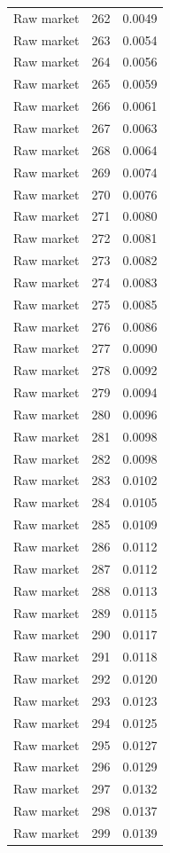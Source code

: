\begin{table}[htbp]
\begin{tabular}{lll}
Raw market & 262 & 0.0049 \\
Raw market & 263 & 0.0054 \\
Raw market & 264 & 0.0056 \\
Raw market & 265 & 0.0059 \\
Raw market & 266 & 0.0061 \\
Raw market & 267 & 0.0063 \\
Raw market & 268 & 0.0064 \\
Raw market & 269 & 0.0074 \\
Raw market & 270 & 0.0076 \\
Raw market & 271 & 0.0080 \\
Raw market & 272 & 0.0081 \\
Raw market & 273 & 0.0082 \\
Raw market & 274 & 0.0083 \\
Raw market & 275 & 0.0085 \\
Raw market & 276 & 0.0086 \\
Raw market & 277 & 0.0090 \\
Raw market & 278 & 0.0092 \\
Raw market & 279 & 0.0094 \\
Raw market & 280 & 0.0096 \\
Raw market & 281 & 0.0098 \\
Raw market & 282 & 0.0098 \\
Raw market & 283 & 0.0102 \\
Raw market & 284 & 0.0105 \\
Raw market & 285 & 0.0109 \\
Raw market & 286 & 0.0112 \\
Raw market & 287 & 0.0112 \\
Raw market & 288 & 0.0113 \\
Raw market & 289 & 0.0115 \\
Raw market & 290 & 0.0117 \\
Raw market & 291 & 0.0118 \\
Raw market & 292 & 0.0120 \\
Raw market & 293 & 0.0123 \\
Raw market & 294 & 0.0125 \\
Raw market & 295 & 0.0127 \\
Raw market & 296 & 0.0129 \\
Raw market & 297 & 0.0132 \\
Raw market & 298 & 0.0137 \\
Raw market & 299 & 0.0139 \\

\end{tabular}
\end{table}
